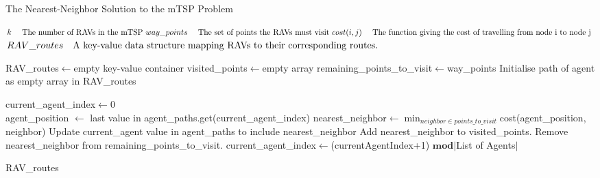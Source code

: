 \begin{algorithm}[h]
\caption{The Nearest-Neighbor Solution to the mTSP Problem}
\label{alg:NNHeuristic}
\begin{algorithmic}[1]
\renewcommand{\algorithmicrequire}{\textbf{Input:}}
\renewcommand{\algorithmicensure}{\textbf{Output:}}

\REQUIRE$ \newline k \quad \text{ The number of RAVs in the mTSP }
\newline way\_points \quad \text{ The set of points the RAVs must visit }
\newline cost(i,j) \quad \text{ The function giving the cost of travelling from node i to node j }
$
\ENSURE $ \newline RAV\_routes \quad \text{A key-value data structure mapping RAVs to their corresponding routes.}
$

\hfill\pagebreak

\STATE RAV\_routes$\leftarrow$empty key-value container
\STATE visited\_points$\leftarrow$empty array
\STATE remaining\_points\_to\_visit$\leftarrow$way\_points
\STATE Initialise path of agent as empty array in RAV\_routes
\ENDFOR

current\_agent\_index$\leftarrow$0\\
\hfill\pagebreak
{}
\STATE agent\_position $\leftarrow$ last value in agent\_paths.get(current\_agent\_index)
\STATE nearest\_neighbor$\leftarrow$\(\displaystyle \min_{neighbor \in points\_to\_visit}\)cost(agent\_position, neighbor)
\STATE Update current\_agent value in agent\_paths to include nearest\_neighbor
\STATE Add nearest\_neighbor to visited\_points.
\STATE Remove nearest\_neighbor from remaining\_points\_to\_visit.
\STATE current\_agent\_index$\leftarrow$(currentAgentIndex+1) $\mathbf{mod}$$\vert$List of Agents$\vert$



\ENDWHILE
\RETURN RAV\_routes
\end{algorithmic} 
\end{algorithm}

